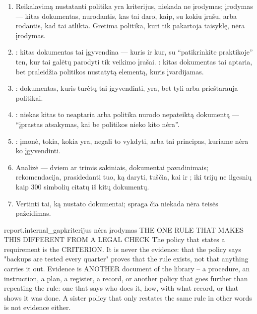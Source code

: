 \begin{enumerate}[itemsep=1pt, topsep=3pt]
  \item Reikalavimą nustatanti politika yra kriterijus, niekada ne įrodymas; įrodymas --- kitas
    dokumentas, nurodantis, kas tai daro, kaip, su kokiu įrašu, arba rodantis, kad tai atlikta.
    Gretima politika, kuri tik pakartoja taisyklę, nėra įrodymas.
  \item {}: kitas dokumentas tai įgyvendina --- kuris ir kur, su \enquote{patikrinkite
    praktikoje} ten, kur tai galėtų parodyti tik veikimo įrašai. : kitas
    dokumentas tai aptaria, bet praleidžia politikos nustatytą elementą, kuris įvardijamas.
  \item {}: dokumentas, kuris turėtų tai įgyvendinti, yra, bet tyli arba
    prieštarauja politikai.
  \item {}: niekas kitas to neaptaria arba politika nurodo nepateiktą dokumentą ---
    \enquote{įprastas atsakymas, kai be politikos nieko kito nėra}.
  \item {}: įmonė, tokia, kokia yra, negali to vykdyti, arba tai principas,
    kuriame nėra ko įgyvendinti.
  \item Analizė --- dviem ar trimis sakiniais, dokumentai pavadinimais; rekomendacija,
    prasidedanti tuo, ką daryti, tuščia, kai  ir ; iki trijų ne
    ilgesnių kaip 300 simbolių citatų iš kitų dokumentų.
  \item Vertinti tai, ką nustato dokumentai; spraga čia niekada nėra teisės pažeidimas.
\end{enumerate}

\par\nopagebreak
\begin{promptexcerpt}{report.internal_gap}{kriterijus nėra įrodymas}
THE ONE RULE THAT MAKES THIS DIFFERENT FROM A LEGAL CHECK
The policy that states a requirement is the CRITERION. It is never the evidence: that the policy says "backups are tested every quarter" proves that the rule exists, not that anything carries it out. Evidence is ANOTHER document of the library – a procedure, an instruction, a plan, a register, a record, or another policy that goes further than repeating the rule: one that says who does it, how, with what record, or that shows it was done. A sister policy that only restates the same rule in other words is not evidence either.
\end{promptexcerpt}

